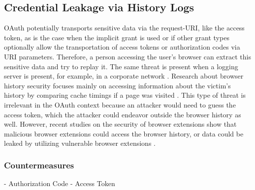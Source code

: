 \documentclass[
    fontsize=12pt,
    headings=small,
    parskip=half,           %
    bibliography=totoc,
    numbers=noenddot,       %
    open=any,               %
    ]{scrreprt}
\begin{document}
\subsection{Credential Leakage via History Logs}
OAuth potentially transports sensitive data via the request-URI, like the access token, as is the case when the implicit grant is used or if other grant types optionally allow the transportation of access tokens or authorization codes via URI parameters. Therefore, a person accessing the user's browser can extract this sensitive data and try to replay it. The same threat is present when a logging server is present, for example, in a corporate network \cite{lodderstedt2020oauth}. Research about browser history security focuses mainly on accessing information about the victim's history by comparing cache timings if a page was visited \cite{bansalcache}. This type of threat is irrelevant in the OAuth context because an attacker would need to guess the access token, which the attacker could endeavor outside the browser history as well. However, recent studies on the security of browser extensions show that malicious browser extensions could access the browser history, or data could be leaked by utilizing vulnerable browser extensions \cite{eriksson2022}.

\subsubsection{Countermeasures}
- Authorization Code
- Access Token
\end{document}
